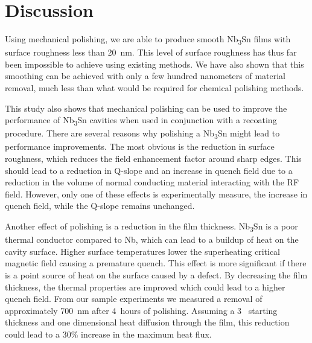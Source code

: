 \documentclass[reprint,amsmath,amssymb,aps]{revtex4-2}%
\begin{document}
%
\section{Discussion}%
\label{sec:Discussion}%
Using mechanical polishing, we are able to produce smooth Nb\textsubscript{3}Sn films with surface roughness less than 20~nm. This level of surface roughness has thus far been impossible to achieve using existing methods.\cite{posen2021advances,pudasaini2018studies,pudasaini2017post,hu2019reducing} We have also shown that this smoothing can be achieved with only a few hundred nanometers of material removal, much less than what would be required for chemical polishing methods.

This study also shows that mechanical polishing can be used to improve the performance of Nb\textsubscript{3}Sn cavities when used in conjunction with a recoating procedure. There are several reasons why polishing a Nb\textsubscript{3}Sn might lead to performance improvements. The most obvious is the reduction in surface roughness, which reduces the field enhancement factor around sharp edges. This should lead to a reduction in Q-slope and an increase in quench field\cite{knobloch1999high, xu2016simulation} due to a reduction in the volume of normal conducting material interacting with the RF field. However, only one of these effects is experimentally measure, the increase in quench field, while the Q-slope remains unchanged.

Another effect of polishing is a reduction in the film thickness. Nb\textsubscript{3}Sn is a poor thermal conductor compared to Nb, which can lead to a buildup of heat on the cavity surface. Higher surface temperatures lower the superheating critical magnetic field causing a premature quench. This effect is more significant if there is a point source of heat on the surface caused by a defect. By decreasing the film thickness, the thermal properties are improved which could lead to a higher quench field. From our sample experiments we measured a removal of approximately 700~nm after 4~hours of polishing. Assuming a 3~\si{\micrometer} starting thickness and one dimensional heat diffusion through the film, this reduction could lead to a 30\% increase in the maximum heat flux.
\end{document}
